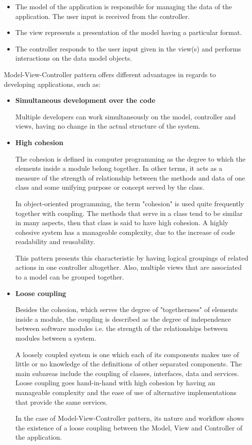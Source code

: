 \documentclass[12pt,a4paper,twoside]{report}
\begin{document}
\begin{itemize}
	\item The model of the application is responsible for managing the data of the application. The user input is received from the controller.
	\item The view represents a presentation of the model having a particular format.
	\item The controller responds to the user input given in the view(s) and performs interactions on the data model objects.
\end{itemize}

Model-View-Controller pattern offers different advantages in regards to developing applications, such as:
\begin{itemize}
	\item \textbf{Simultaneous development over the code} 
	
	Multiple developers can work simultaneously on the model, controller and views, having no change in the actual structure of the system.
	\item \textbf{High cohesion}
			
	The cohesion is defined in computer programming as the degree to which the elements inside a module belong together. In other terms, it acts as a measure of the strength of relationship between the methods and data of one class and some unifying purpose or concept served by the class.
	
	In object-oriented programming, the term "cohesion" is used quite frequently together with coupling. The methods that serve in a class tend to be similar in many aspects, then that class is said to have high cohesion. A highly cohesive system has a manageable complexity, due to the increase of code readability and reusability. 
	
	This pattern presents this characteristic by having logical groupings of related actions in one controller altogether. Also, multiple views that are associated to a model can be grouped together. 
	
	\item \textbf{Loose coupling}
	
	Besides the cohesion, which serves the degree of "togetherness" of elements inside a module, the coupling is described as the degree of independence between software modules i.e. the strength of the relationships between modules between a system.
	
	A loosely coupled system is one which each of its components makes use of little or no knowledge of the definitions of other separated components. The main subareas include the coupling of classes, interfaces, data and services. Loose coupling goes hand-in-hand with high cohesion by having an manageable complexity and the ease of use of alternative implementations that provide the same services. 
	
	In the case of Model-View-Controller pattern, its nature and workflow shows the existence of a loose coupling between the Model, View and Controller of the application.	

\end{itemize} 
\end{document}
